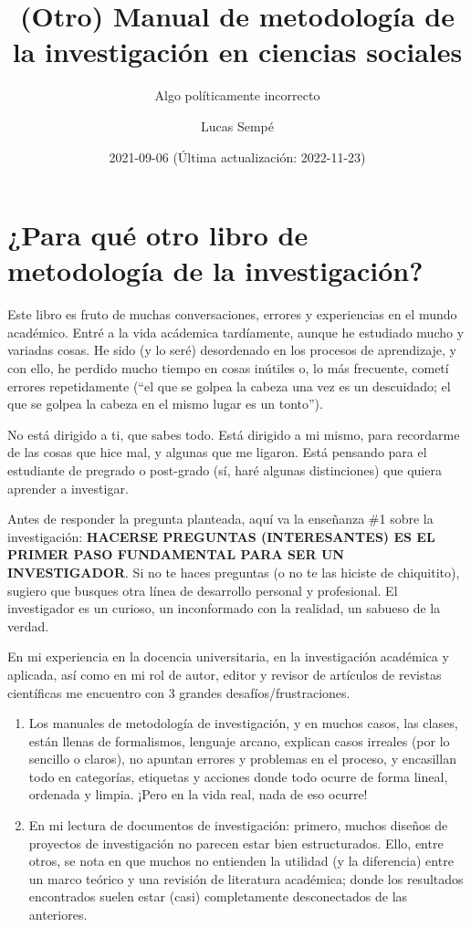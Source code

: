 \documentclass[
]{book}
\title{(Otro) Manual de metodología de la investigación en ciencias sociales}
\subtitle{Algo políticamente incorrecto}
\author{Lucas Sempé}
\date{2021-09-06 (Última actualización: 2022-11-23)}
\begin{document}
\maketitle

{
\setcounter{tocdepth}{1}
\tableofcontents
}
\hypertarget{para-quuxe9-otro-libro-de-metodologuxeda-de-la-investigaciuxf3n}{%
\chapter{¿Para qué otro libro de metodología de la investigación?}\label{para-quuxe9-otro-libro-de-metodologuxeda-de-la-investigaciuxf3n}}

Este libro es fruto de muchas conversaciones, errores y experiencias en el mundo académico. Entré a la vida acádemica tardíamente, aunque he estudiado mucho y variadas cosas. He sido (y lo seré) desordenado en los procesos de aprendizaje, y con ello, he perdido mucho tiempo en cosas inútiles o, lo más frecuente, cometí errores repetidamente (``el que se golpea la cabeza una vez es un descuidado; el que se golpea la cabeza en el mismo lugar es un tonto'').

No está dirigido a ti, que sabes todo. Está dirigido a mi mismo, para recordarme de las cosas que hice mal, y algunas que me ligaron. Está pensando para el estudiante de pregrado o post-grado (sí, haré algunas distinciones) que quiera aprender a investigar.

Antes de responder la pregunta planteada, aquí va la enseñanza \#1 sobre la investigación: \textbf{HACERSE PREGUNTAS (INTERESANTES) ES EL PRIMER PASO FUNDAMENTAL PARA SER UN INVESTIGADOR}. Si no te haces preguntas (o no te las hiciste de chiquitito), sugiero que busques otra línea de desarrollo personal y profesional. El investigador es un curioso, un inconformado con la realidad, un sabueso de la verdad.

En mi experiencia en la docencia universitaria, en la investigación académica y aplicada, así como en mi rol de autor, editor y revisor de artículos de revistas científicas me encuentro con 3 grandes desafíos/frustraciones.

\begin{enumerate}
\def\labelenumi{\arabic{enumi})}
\item
  Los manuales de metodología de investigación, y en muchos casos, las clases, están llenas de formalismos, lenguaje arcano, explican casos irreales (por lo sencillo o claros), no apuntan errores y problemas en el proceso, y encasillan todo en categorías, etiquetas y acciones donde todo ocurre de forma lineal, ordenada y limpia. ¡Pero en la vida real, nada de eso ocurre!
\item
  En mi lectura de documentos de investigación: primero, muchos diseños de proyectos de investigación no parecen estar bien estructurados. Ello, entre otros, se nota en que muchos no entienden la utilidad (y la diferencia) entre un marco teórico y una revisión de literatura académica; donde los resultados encontrados suelen estar (casi) completamente desconectados de las anteriores.
\end{enumerate}
\end{document}
